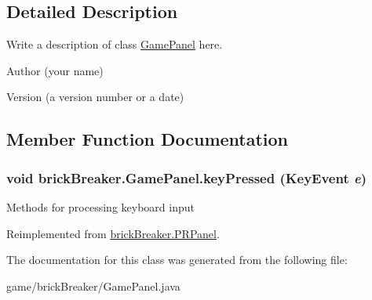 \subsection{Detailed Description}
Write a description of class \hyperlink{classbrick_breaker_1_1_game_panel}{GamePanel} here.

\begin{DoxyAuthor}{Author}
(your name) 
\end{DoxyAuthor}
\begin{DoxyVersion}{Version}
(a version number or a date) 
\end{DoxyVersion}


\subsection{Member Function Documentation}
\hypertarget{classbrick_breaker_1_1_game_panel_abf3d766d8fff87e69bfaf8ff59c438f3}{
\subsubsection[{keyPressed}]{\setlength{\rightskip}{0pt plus 5cm}void brickBreaker.GamePanel.keyPressed (KeyEvent {\em e})}}
\label{classbrick_breaker_1_1_game_panel_abf3d766d8fff87e69bfaf8ff59c438f3}
Methods for processing keyboard input 

Reimplemented from \hyperlink{classbrick_breaker_1_1_p_r_panel}{brickBreaker.PRPanel}.



The documentation for this class was generated from the following file:\begin{DoxyCompactItemize}
\item 
game/brickBreaker/GamePanel.java\end{DoxyCompactItemize}
